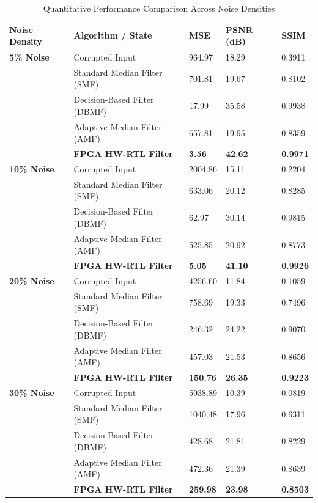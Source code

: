 \documentclass[12pt,a4paper]{article}
\begin{document}
\begin{table}[htbp]
\centering
\caption{Quantitative Performance Comparison Across Noise Densities}
\label{tab:metrics}
\small
\begin{tabularx}{\textwidth}{llXXX}
\toprule
\textbf{Noise Density} & \textbf{Algorithm / State} & \textbf{MSE} & \textbf{PSNR (dB)} & \textbf{SSIM} \\
\midrule
\textbf{5\% Noise} & Corrupted Input & 964.97 & 18.29 & 0.3911 \\
                   & Standard Median Filter (SMF) & 701.81 & 19.67 & 0.8102 \\
                   & Decision-Based Filter (DBMF) & 17.99 & 35.58 & 0.9938 \\
                   & Adaptive Median Filter (AMF) & 657.81 & 19.95 & 0.8359 \\
                   & \textbf{FPGA HW-RTL Filter} & \textbf{3.56} & \textbf{42.62} & \textbf{0.9971} \\
\midrule
\textbf{10\% Noise}& Corrupted Input & 2004.86 & 15.11 & 0.2204 \\
                   & Standard Median Filter (SMF) & 633.06 & 20.12 & 0.8285 \\
                   & Decision-Based Filter (DBMF) & 62.97 & 30.14 & 0.9815 \\
                   & Adaptive Median Filter (AMF) & 525.85 & 20.92 & 0.8773 \\
                   & \textbf{FPGA HW-RTL Filter} & \textbf{5.05} & \textbf{41.10} & \textbf{0.9926} \\
\midrule
\textbf{20\% Noise}& Corrupted Input & 4256.60 & 11.84 & 0.1059 \\
                   & Standard Median Filter (SMF) & 758.69 & 19.33 & 0.7496 \\
                   & Decision-Based Filter (DBMF) & 246.32 & 24.22 & 0.9070 \\
                   & Adaptive Median Filter (AMF) & 457.03 & 21.53 & 0.8656 \\
                   & \textbf{FPGA HW-RTL Filter} & \textbf{150.76} & \textbf{26.35} & \textbf{0.9223} \\
\midrule
\textbf{30\% Noise}& Corrupted Input & 5938.89 & 10.39 & 0.0819 \\
                   & Standard Median Filter (SMF) & 1040.48 & 17.96 & 0.6311 \\
                   & Decision-Based Filter (DBMF) & 428.68 & 21.81 & 0.8229 \\
                   & Adaptive Median Filter (AMF) & 472.36 & 21.39 & 0.8639 \\
                   & \textbf{FPGA HW-RTL Filter} & \textbf{259.98} & \textbf{23.98} & \textbf{0.8503} \\
\bottomrule
\end{tabularx}
\end{table}
\end{document}
